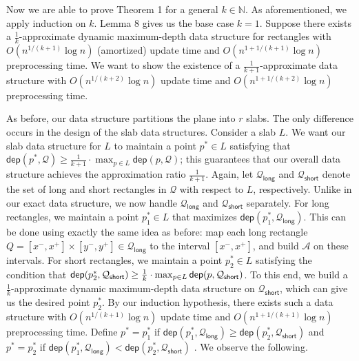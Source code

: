 \documentclass[10pt,a4paper]{article}
\begin{document}
Now we are able to prove Theorem 1 for a general $k\in\mathbb{N}$. As aforementioned, we apply induction on $k$. Lemma 8 gives us the base case $k=1$. Suppose there exists a $\frac{1}{k}$-approximate dynamic maximum-depth data structure for rectangles with $O(n^{1/(k+1)}\log n)$ (amortized) update time and $O(n^{1+1/(k+1)}\log n)$ preprocessing time. We want to show the existence of a $\frac{1}{k+1}$-approximate data structure with $O(n^{1/(k+2)}\log n)$ update time and $O(n^{1+1/(k+2)}\log n)$ preprocessing time.
\par
\par
As before, our data structure partitions the plane into $r$ slabs. The only difference occurs in the design of the slab data structures. Consider a slab $L$. We want our slab data structure for $L$ to maintain a point $p^{*}\in L$ satisfying that $\mathsf{dep}(p^{*},\mathcal{Q})\geq\frac{1}{k+1}\cdot\max_{p\in L}\mathsf{dep}%
(p,\mathcal{Q})$; this guarantees that our overall data structure achieves the approximation ratio $\frac{1}{k+1}$. Again, let $\mathcal{Q}_{\mathsf{long}}$ and $\mathcal{Q}_{\mathsf{short}}$ denote the set of long and short rectangles in $\mathcal{Q}$ with respect to $L$, respectively. Unlike in our exact data structure, we now handle $\mathcal{Q}_{\mathsf{long}}$ and $\mathcal{Q}_{\mathsf{short}}$ separately. For long rectangles, we maintain a point $p_{1}^{*}\in L$ that maximizes $\mathsf{dep}(p_{1}^{*},\mathcal{Q}_{\mathsf{long}})$. This can be done using exactly the same idea as before: map each long rectangle $Q=[x^{-},x^{+}]\times[y^{-},y^{+}]\in\mathcal{Q}_{\mathsf{long}}$ to the interval $[x^{-},x^{+}]$, and build $\mathcal{A}$ on these intervals. For short rectangles, we maintain a point $p_{2}^{*}\in L$ satisfying the condition that $\mathsf{dep}(p_{2}^{*},\mathcal{Q}_{\mathsf{short}})\geq\frac{1}{k}\cdot\max_{%
p\in L}\mathsf{dep}(p,\mathcal{Q}_{\mathsf{short}})$. To this end, we build a $\frac{1}{k}$-approximate dynamic maximum-depth data structure on $\mathcal{Q}_{\mathsf{short}}$, which can give us the desired point $p_{2}^{*}$. By our induction hypothesis, there exists such a data structure with $O(n^{1/(k+1)}\log n)$ update time and $O(n^{1+1/(k+1)}\log n)$ preprocessing time. Define $p^{*}=p_{1}^{*}$ if $\mathsf{dep}(p_{1}^{*},\mathcal{Q}_{\mathsf{long}})\geq\mathsf{dep}(p_{2}^{*},%
\mathcal{Q}_{\mathsf{short}})$ and $p^{*}=p_{2}^{*}$ if $\mathsf{dep}(p_{1}^{*},\mathcal{Q}_{\mathsf{long}})<\mathsf{dep}(p_{2}^{*},%
\mathcal{Q}_{\mathsf{short}})$ . We observe the following.
\end{document}
